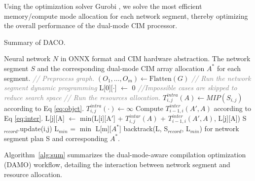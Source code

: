 Using the optimization solver Gurobi \cite{gurobi}, we solve the most efficient memory/compute mode allocation for each network segment, thereby optimizing the overall performance of the dual-mode CIM processor. 

\begin{algorithm}[t!]
  \caption{Summary of DACO.}
  \label{alg:sum}
\begin{algorithmic}[1]
     Neural network $N$ in ONNX format and CIM hardware abstraction.
     The network segment $S$ and the corresponding dual-mode CIM array allocation $A^*$ for each segment.
    \STATE \emph{\textcolor{gray}{// Preprocess graph.}}
    \STATE $(O_1, \ldots, O_m) \leftarrow \text{Flatten}(G)$
    \STATE \emph{\textcolor{gray}{// Run the network segment dynamic programming}}
     \STATE L[0][$\cdot$] $\leftarrow$ 0
        \STATE \emph{\textcolor{gray}{//Impossible cases are skipped to reduce search space}}
            \STATE  \emph{\textcolor{gray}{// Run the resources allocation.}}
            \STATE $T_{i,j}^{intra}(A)\leftarrow MIP(S_{i,j})$ according to Eq \ref{eq:objct}. 
        \ELSE
            \STATE $T_{i,j}^{intra}(\cdot)\leftarrow \infty$
        \ENDIF
        \STATE Compute $T_{i-1,i}^{inter}(A',A)$ according to Eq \ref{eq:inter}.
        \STATE L[j][A] $\leftarrow$ min(L[i][A$'$] + $T_{i,j}^{intar}(A)$ + $T_{i-1,i}^{inter}(A',A)$, L[j][A])  
        \STATE S$_{record}$.update(i,j)
    \ENDFOR
    \STATE L$_{min}$ = $\min$ L[m][$A^*$]
    \RETURN backtrack(L, S$_{record}$, L$_{min}$) for network segment plan S and corresponding $A^*$.
\end{algorithmic}
\end{algorithm}
Algorithm~\ref{alg:sum} summarizes the dual-mode-aware compilation optimization (DAMO) workflow, detailing the interaction between network segment and resource allocation. 

